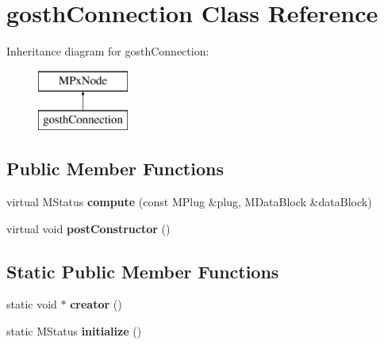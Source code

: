 \hypertarget{classgosth_connection}{\section{gosth\-Connection Class Reference}
\label{classgosth_connection}
}
Inheritance diagram for gosth\-Connection\-:\begin{figure}[H]
\begin{center}
\leavevmode
\includegraphics[height=2.000000cm]{classgosth_connection}
\end{center}
\end{figure}
\subsection*{Public Member Functions}
\begin{DoxyCompactItemize}
\item 
\hypertarget{classgosth_connection_a6bb148aff1437139505e09520989b6fb}{virtual M\-Status {\bfseries compute} (const M\-Plug \&plug, M\-Data\-Block \&data\-Block)}\label{classgosth_connection_a6bb148aff1437139505e09520989b6fb}

\item 
\hypertarget{classgosth_connection_a45e445e4b40078c2c13790e0e52da799}{virtual void {\bfseries post\-Constructor} ()}\label{classgosth_connection_a45e445e4b40078c2c13790e0e52da799}

\end{DoxyCompactItemize}
\subsection*{Static Public Member Functions}
\begin{DoxyCompactItemize}
\item 
\hypertarget{classgosth_connection_a40e77eaf970be519ebb356cccb69de48}{static void $\ast$ {\bfseries creator} ()}\label{classgosth_connection_a40e77eaf970be519ebb356cccb69de48}

\item 
\hypertarget{classgosth_connection_a4f3754dff2f9bf32a247d96ae5f3120a}{static M\-Status {\bfseries initialize} ()}\label{classgosth_connection_a4f3754dff2f9bf32a247d96ae5f3120a}

\end{DoxyCompactItemize}
